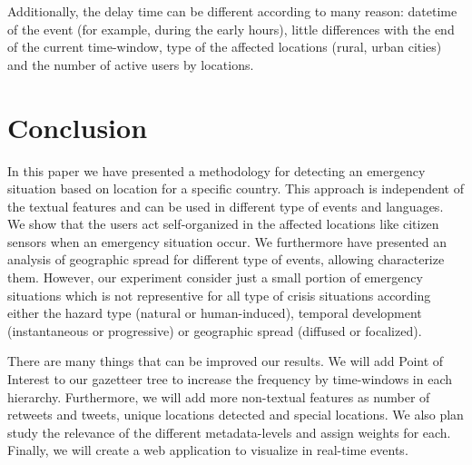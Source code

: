 \documentclass[sigconf]{acmart}
\begin{document}
Additionally, the delay time can be different according to many reason: datetime of the event (for example, during the early hours), little differences with the end of the current time-window, type of the affected locations (rural, urban cities) and the number of active users by locations.

	

\section{Conclusion}

In this paper we have presented a methodology for detecting an emergency situation based on location for a specific country. This approach is independent of the textual features and can be used in different type of events and languages. We show that the users act self-organized in the affected locations like citizen sensors when an emergency situation occur. We furthermore have presented an analysis of geographic spread for different type of events, allowing characterize them. However, our experiment consider just a small portion of emergency situations which is not representive for all type of crisis situations according either the hazard type (natural or human-induced), temporal development (instantaneous or progressive) or geographic spread (diffused or focalized).

There are many things that can be improved our results. We will add Point of Interest to our gazetteer tree to increase the frequency by time-windows in each hierarchy. Furthermore, we will add more non-textual features as number of retweets and tweets, unique locations detected and special locations. We also plan study the relevance of the different metadata-levels and assign weights for each. Finally, we will create a web application to visualize in real-time events.
\end{document}
